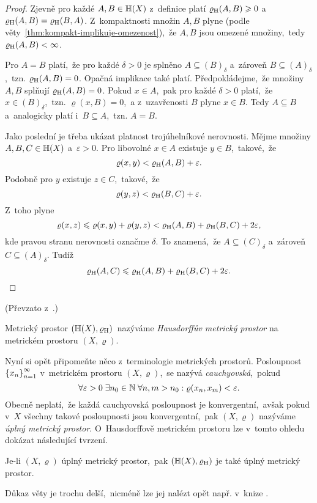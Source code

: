 \begin{proof}
    Zjevně pro každé $A,B\in\mathbb{H}(X)$ z~definice platí $\varrho_\textup{H}(A,B)\geqslant 0$ a~$\varrho_\textup{H}(A,B)=\varrho_\textup{H}(B,A)$. Z~kompaktnosti množin $A,B$ plyne (podle věty~\ref{thm:kompakt-implikuje-omezenost}),~že $A,B$ jsou omezené množiny,~tedy $\varrho_\textup{H}(A,B)<\infty$.
    
    Pro $A=B$ platí,~že pro každé $\delta>0$ je splněno $A\subseteq (B)_\delta$ a~zároveň $B\subseteq (A)_\delta$,~tzn. $\varrho_\textup{H}(A,B)=0$. Opačná implikace také platí. Předpokládejme,~že množiny $A,B$ splňují $\varrho_\textup{H}(A,B)=0$. Pokud $x\in A$,~pak pro každé $\delta>0$ platí,~že $x\in (B)_\delta$,~tzn. $\varrho(x,B)=0$,~a z~uzavřenosti $B$ plyne $x\in B$. Tedy $A\subseteq B$ a~analogicky platí i~$B\subseteq A$,~tzn. $A=B$.

    Jako poslední je třeba ukázat platnost trojúhelníkové nerovnosti. Mějme množiny $A,B,C\in\mathbb{H}(X)$ a~$\varepsilon>0$. Pro libovolné $x\in A$ existuje $y\in B$,~takové,~že
    \[\varrho(x,y)<\varrho_\textup{H}(A,B)+\varepsilon.\]
    Podobně pro $y$ existuje $z\in C$,~takové,~že
    \[\varrho(y,z)<\varrho_\textup{H}(B,C)+\varepsilon.\]
    Z~toho plyne
    \[\varrho(x,z)\leqslant\varrho(x,y)+\varrho(y,z)<\varrho_\textup{H}(A,B)+\varrho_\textup{H}(B,C)+2\varepsilon,\]
    kde pravou stranu nerovnosti označme $\delta$. To znamená,~že $A\subseteq (C)_\delta$ a~zároveň $C\subseteq (A)_\delta$. Tudíž
    \[\varrho_\textup{H}(A,C)\leqslant\varrho_\textup{H}(A,B)+\varrho_\textup{H}(B,C)+2\varepsilon.\]
\end{proof}
(Převzato z~\citep[str. 72]{Edgar2008}.)
\begin{definition}\label{def:hausdorffuv-mp}
    Metrický prostor $(\mathbb{H}(X),\varrho_\textup{H})$~nazýváme \emph{Hausdorffův metrický prostor} na metrickém prostoru $(X,\varrho)$.
\end{definition}
Nyní si opět připomeňte něco z~terminologie metrických prostorů. Posloupnost $\left\{x_n\right\}_{n=1}^\infty$ v~metrickém prostoru $(X,\varrho)$,~se nazývá \emph{cauchyovská},~pokud
\[\forall\varepsilon>0\;\exists n_0\in\mathbb{N}\;\forall n,m>n_0: \varrho(x_n,x_m)<\varepsilon.\]
Obecně neplatí,~že každá cauchyovská posloupnost je konvergentní,~avšak pokud v~$X$ všechny takové posloupnosti jsou konvergentní,~pak $(X,\varrho)$ nazýváme \emph{úplný metrický prostor}. O~Hausdorffově metrickém prostoru lze v~tomto ohledu dokázat následující tvrzení.
\begin{theorem}\label{thm:uplnost-hmp}
    Je-li $(X,\varrho)$ úplný metrický prostor,~pak $(\mathbb{H}(X),\varrho_\textup{H})$ je také úplný metrický prostor.
\end{theorem}
Důkaz věty je trochu delší,~nicméně lze jej nalézt opět např. v~knize \citep[str. 72]{Edgar2008}.